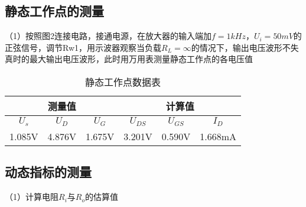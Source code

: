 \documentclass{article}
\begin{document}
\subsection {静态工作点的测量}
（1）按照图2连接电路，接通电源，在放大器的输入端加$f=1kHz$，$U_i=50mV$的正弦信号，调节Rw1，用示波器观察当负载$R_L=\infty$的情况下，输出电压波形不失真时的最大输出电压波形，此时用万用表测量静态工作点的各电压值  \par
\begin{table}[h]
	\centering  
	\begin{tabular}{c|c|c|c|c|c}
		\hline
	        \multicolumn{3}{c}{测量值} \vline    &  \multicolumn{3}{c}{计算值} \\\hline
		    $U_s$  &  $U_D$    & $U_G$     & $U_{DS}$ & $U_{GS}$    &$I_D$    \\ \hline
		    1.085V &  4.876V   & 1.675V    &3.201V    &0.590V      &  1.668mA\\   \hline
	\end{tabular}
	\caption{静态工作点数据表}\label{SIGN}
	\end{table}
	
\subsection{动态指标的测量}
（1）计算电阻$R_i$与$R_o$的估算值\par
\end{document}

